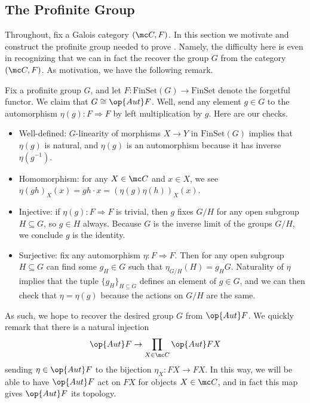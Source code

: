 \documentclass{amsart}
\begin{document}
\subsection{The Profinite Group}
Throughout, fix a Galois category $(\mc C,F)$. In this section we motivate and construct the profinite group needed to prove . Namely, the difficulty here is even in recognizing that we can in fact the recover the group $G$ from the category $(\mc C,F)$. As motivation, we have the following remark.
\begin{remark}
    Fix a profinite group $G$, and let $F\colon\mathrm{FinSet}(G)\to\mathrm{FinSet}$ denote the forgetful functor. We claim that $G\cong\op{Aut}F$. Well, send any element $g\in G$ to the automorphism $\eta(g)\colon F\Rightarrow F$ by left multiplication by $g$. Here are our checks.
    \begin{itemize}
        \item Well-defined: $G$-linearity of morphisms $X\to Y$ in $\mathrm{FinSet}(G)$ implies that $\eta(g)$ is natural, and $\eta(g)$ is an automorphism because it has inverse $\eta(g^{-1})$.
        \item Homomorphism: for any $X\in\mc C$ and $x\in X$, we see $\eta(gh)_X(x)=gh\cdot x=(\eta(g)\eta(h))_X(x)$.
        \item Injective: if $\eta(g)\colon F\Rightarrow F$ is trivial, then $g$ fixes $G/H$ for any open subgroup $H\subseteq G$, so $g\in H$ always. Because $G$ is the inverse limit of the groups $G/H$, we conclude $g$ is the identity.
        \item Surjective: fix any automorphism $\eta\colon F\Rightarrow F$. Then for any open subgroup $H\subseteq G$ can find some $g_H\in G$ such that $\eta_{G/H}(H)=g_HG$. Naturality of $\eta$ implies that the tuple $\{g_H\}_{H\subseteq G}$ defines an element of $g\in G$, and we can then check that $\eta=\eta(g)$ because the actions on $G/H$ are the same.
    \end{itemize}
\end{remark}
As such, we hope to recover the desired group $G$ from $\op{Aut}F$. We quickly remark that there is a natural injection
\begin{equation}
    \op{Aut}F\to\prod_{X\in\mc C}\op{Aut}FX \label{eq:aut-f-top}
\end{equation}
sending $\eta\in\op{Aut}F$ to the bijection $\eta_X\colon FX\to FX$. In this way, we will be able to have $\op{Aut}F$ act on $FX$ for objects $X\in\mc C$, and in fact this map gives $\op{Aut}F$ its topology.
\end{document}
